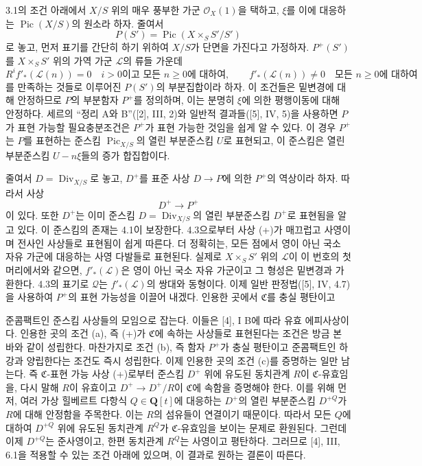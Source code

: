 \documentclass[11pt,twoside,openany]{book}
\numberwithin{equation}{section}
\newcommand{\sourceunit}{front}
\newcommand{\src}[1]{%
  \phantomsection\hypertarget{src:\sourceunit:#1}{}%
  \marginpar{\raggedleft\footnotesize\sffamily #1}%
}
\theoremstyle{plain}
\theoremstyle{definition}
\theoremstyle{remark}
\begin{document}
3.1의 조건 아래에서 $X/S$ 위의 매우 풍부한 가군
$\mathcal O_X(1)$을 택하고, $\xi$를 이에 대응하는
$\operatorname{Pic}(X/S)$의 원소라 하자. 줄여서
\[
P(S')=\operatorname{Pic}(X\times_SS'/S')
\]
로 놓고, 먼저 표기를 간단히 하기 위하여 $X/S$가 단면을 가진다고
가정하자. $P^+(S')$를 $X\times_SS'$ 위의 가역 가군 $\mathcal L$의
류들 가운데
\[
R^if'_*(\mathcal L(n))=0\quad\text{$i>0$이고 모든 $n\geq0$에 대하여},
\qquad
f'_*(\mathcal L(n))\neq0\quad\text{모든 $n\geq0$에 대하여}
\]
를 만족하는 것들로 이루어진 $P(S')$의 부분집합이라 하자. 이 조건들은
밑변경에 대해 안정하므로 $P$의 부분함자 $P^+$를 정의하며, 이는 분명히
$\xi$에 의한 평행이동에 대해 안정하다. 세르의 “정리 A와 B”([2], III,
2)와 일반적 결과들([5], IV, 5)을 사용하면 $P$가 표현 가능할
필요충분조건은 $P^+$가 표현 가능한 것임을 쉽게 알 수 있다. 이 경우
$P^+$는 $P$를 표현하는 준스킴 $\operatorname{Pic}_{X/S}$의 열린
부분준스킴 $U$로 표현되고, 이 준스킴은 열린 부분준스킴 $U-n\xi$들의
증가 합집합이다.

줄여서 $D=\operatorname{Div}_{X/S}$로 놓고, $D^+$를 표준 사상
$D\longrightarrow P$에 의한 $P^+$의 역상이라 하자. 따라서 사상
\begin{equation}
D^+\longrightarrow P^+
\tag{+}
\end{equation}
이 있다. 또한 $D^+$는 이미 준스킴 $D=\operatorname{Div}_{X/S}$의
열린 부분준스킴 $D^+$로 표현됨을 알고 있다. 이 준스킴의 존재는 4.1이
보장한다. 4.3으로부터 사상 (+)가 매끄럽고 사영이며 전사인 사상들로
표현됨이 쉽게 따른다. 더 정확히는, 모든 점에서 영이 아닌 국소 자유
가군에 대응하는 사영 다발들로 표현된다. 실제로
$X\times_SS'$ 위의 $\mathcal L$이 이 번호의 첫머리에서와 같으면,
$f'_*(\mathcal L)$은 영이 아닌 국소 자유 가군이고 그 형성은 밑변경과
가환한다. 4.3의 표기로 $\mathcal Q$는 $f'_*(\mathcal L)$의 쌍대와
동형이다. 이제 일반 판정법([5], IV, 4.7)을 사용하여 $P^+$의 표현
가능성을 이끌어 내겠다. 인용한 곳에서 $\mathfrak C$를 충실 평탄이고

\src{155}
준콤팩트인 준스킴 사상들의 모임으로 잡는다. 이들은 [4], I B에 따라
유효 에피사상이다. 인용한 곳의 조건 (a), 즉 (+)가
$\mathfrak C$에 속하는 사상들로 표현된다는 조건은 방금 본 바와 같이
성립한다. 마찬가지로 조건 (b), 즉 함자 $P^+$가 충실 평탄이고
준콤팩트인 하강과 양립한다는 조건도 즉시 성립한다. 이제 인용한 곳의
조건 (c)를 증명하는 일만 남는다. 즉 $\mathfrak C$-표현 가능 사상
(+)로부터 준스킴 $D^+$ 위에 유도된 동치관계 $R$이
$\mathfrak C$-유효임을, 다시 말해 $R$이 유효이고
$D^+\longrightarrow D^+/R$이 $\mathfrak C$에 속함을 증명해야 한다.
이를 위해 먼저, 여러 가상 힐베르트 다항식 $Q\in\mathbf Q[t]$에 대응하는
$D^+$의 열린 부분준스킴 $D^{+Q}$가 $R$에 대해 안정함을 주목한다.
이는 $R$의 섬유들이 연결이기 때문이다. 따라서 모든 $Q$에 대하여
$D^{+Q}$ 위에 유도된 동치관계 $R^Q$가 $\mathfrak C$-유효임을 보이는
문제로 환원된다. 그런데 이제 $D^{+Q}$는 준사영이고, 한편 동치관계
$R^Q$는 사영이고 평탄하다. 그러므로 [4], III, 6.1을 적용할 수 있는
조건 아래에 있으며, 이 결과로 원하는 결론이 따른다.
\end{document}
